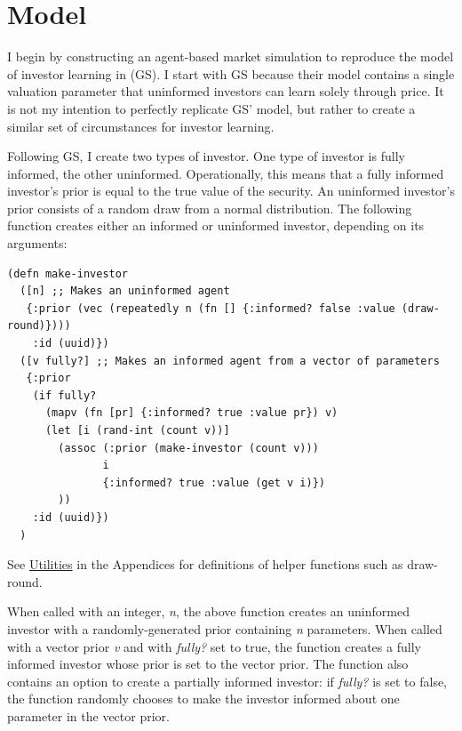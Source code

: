 \documentclass[11pt]{article}
\begin{document}
\section{Model}
\label{sec:org7ef693a}
I begin by constructing an agent-based market simulation to reproduce the model of investor learning in \citet{grossmanImpossibilityInformationallyEfficient1980} (GS). I start with GS because their model contains a single valuation parameter that uninformed investors can learn solely through price. It is not my intention to perfectly replicate GS' model, but rather to create a similar set of circumstances for investor learning.

Following GS, I create two types of investor. One type of investor is fully informed, the other uninformed. Operationally, this means that a fully informed investor's prior is equal to the true value of the security. An uninformed investor's prior consists of a random draw from a normal distribution. The following function creates either an informed or uninformed investor, depending on its arguments:

\singlespacing
\lstset{language=Lisp,label= ,caption= ,captionpos=b,numbers=none}
\begin{lstlisting}
(defn make-investor
  ([n] ;; Makes an uninformed agent
   {:prior (vec (repeatedly n (fn [] {:informed? false :value (draw-round)}))) 
    :id (uuid)})
  ([v fully?] ;; Makes an informed agent from a vector of parameters
   {:prior
    (if fully?
      (mapv (fn [pr] {:informed? true :value pr}) v)
      (let [i (rand-int (count v))]
        (assoc (:prior (make-investor (count v)))
               i
               {:informed? true :value (get v i)})
        ))
    :id (uuid)})
  )
\end{lstlisting}
\doublespacing

See \hyperref[sec:org95e66fb]{Utilities} in the Appendices for definitions of helper functions such as draw-round.

When called with an integer, \emph{n}, the above function creates an uninformed investor with a randomly-generated prior containing \emph{n} parameters. When called with a vector prior \emph{v} and with \emph{fully?} set to true, the function creates a fully informed investor whose prior is set to the vector prior. The function also contains an option to create a partially informed investor: if \emph{fully?} is set to false, the function randomly chooses to make the investor informed about one parameter in the vector prior. 
\end{document}
